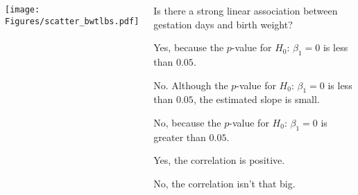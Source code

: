 \begin{frame}[fragile]
\begin{columns}
\begin{center}
\texttt{[image: Figures/scatter\_bwtlbs.pdf]}
\end{center}
\begin{clicker}{\small{Is there a strong linear association between gestation days and birth weight?}}
\begin{enumerate}
    \small{
    \item
    Yes, because the $p$-value for $H_0$: $\beta_1=0$ is less than $0.05$.
    \item
    No. Although the $p$-value for $H_0$: $\beta_1=0$ is less than $0.05$, the estimated slope is small.
    \item
     No, because the $p$-value for $H_0$: $\beta_1=0$ is greater than $0.05$.
    \item
    Yes, the correlation is positive.
    \item
    No, the correlation isn't that big.}
\end{enumerate}
\end{clicker}
\end{columns}
\end{frame}


 